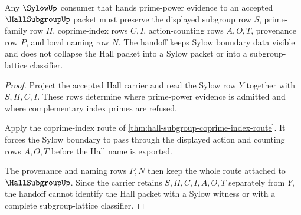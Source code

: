 \begin{theorem}
\label{thm:hall-subgroup-sylow-boundary-handoff}
Any $\SylowUp$ consumer that hands prime-power evidence to an accepted $\HallSubgroupUp$ packet must preserve the displayed subgroup row $S$, prime-family row $\Pi$, coprime-index rows $C,I$, action-counting rows $A,O,T$, provenance row $P$, and local naming row $N$. The handoff keeps Sylow boundary data visible and does not collapse the Hall packet into a Sylow packet or into a subgroup-lattice classifier.
\end{theorem}
\begin{proof}
Project the accepted Hall carrier and read the Sylow row $Y$ together with $S,\Pi,C,I$. These rows determine where prime-power evidence is admitted and where complementary index primes are refused.

Apply the coprime-index route of \autoref{thm:hall-subgroup-coprime-index-route}. It forces the Sylow boundary to pass through the displayed action and counting rows $A,O,T$ before the Hall name is exported.

The provenance and naming rows $P,N$ then keep the whole route attached to $\HallSubgroupUp$. Since the carrier retains $S,\Pi,C,I,A,O,T$ separately from $Y$, the handoff cannot identify the Hall packet with a Sylow witness or with a complete subgroup-lattice classifier.
\end{proof}




